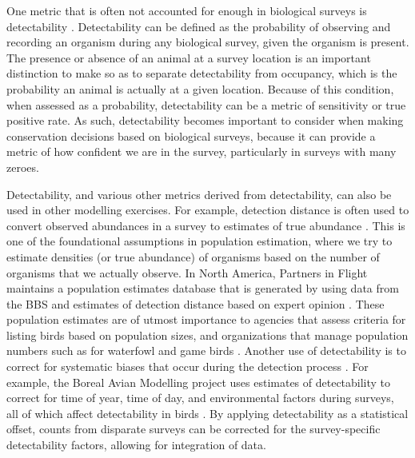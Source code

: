 \par One metric that is often not accounted for enough in biological surveys is detectability \citep{bennett_how_2024}.
Detectability can be defined as the probability of observing and recording an organism during any biological survey, given the organism is present.
The presence or absence of an animal at a survey location is an important distinction to make so as to separate detectability from occupancy, which is the probability an animal is actually at a given location.
Because of this condition, when assessed as a probability, detectability can be a metric of sensitivity or true positive rate.
As such, detectability becomes important to consider when making conservation decisions based on biological surveys, because it can provide a metric of how confident we are in the survey, particularly in surveys with many zeroes.

\par Detectability, and various other metrics derived from detectability, can also be used in other modelling exercises.
For example, detection distance is often used to convert observed abundances in a survey to estimates of true abundance \citep{buckland_introduction_2001, buckland_distance_2015}.
This is one of the foundational assumptions in population estimation, where we try to estimate densities (or true abundance) of organisms based on the number of organisms that we actually observe.
In North America, Partners in Flight maintains a population estimates database that is generated by using data from the BBS and estimates of detection distance based on expert opinion \citep{will_handbook_2020, stanton_estimating_2019}.
These population estimates are of utmost importance to agencies that assess criteria for listing birds based on population sizes, and organizations that manage population numbers such as for waterfowl and game birds \citep{canadian_wildlife_service_waterfowl_committee_population_2022}.
Another use of detectability is to correct for systematic biases that occur during the detection process \citep{johnson_defense_2008, solymos_calibrating_2013}.
For example, the Boreal Avian Modelling project uses estimates of detectability to correct for time of year, time of day, and environmental factors during surveys, all of which affect detectability in birds \cite{solymos_lessons_2020, solymos_evaluating_2018, marsh_correcting_1989}.
By applying detectability as a statistical offset, counts from disparate surveys can be corrected for the survey-specific detectability factors, allowing for integration of data.

